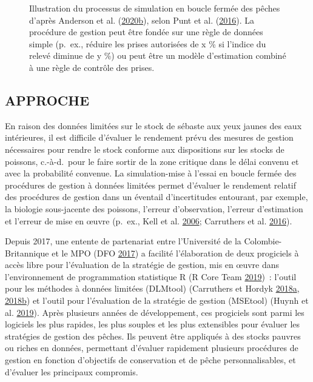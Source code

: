 \documentclass[french,11pt]{book}
\begin{document}
\begin{figure}[htb]

{\centering {} 

}

\caption{Illustration du processus de simulation en boucle fermée des pêches d'après Anderson et al. (\protect\hyperlink{ref-anderson2020gfmp}{2020}\protect\hyperlink{ref-anderson2020gfmp}{b}), selon Punt et al. (\protect\hyperlink{ref-punt2016}{2016}). La procédure de gestion peut être fondée sur une règle de données simple (p.~ex., réduire les prises autorisées de x \% si l'indice du relevé diminue de y \%) ou peut être un modèle d'estimation combiné à une règle de contrôle des prises.}\label{fig:mse-chart-basic}
\end{figure}
\hypertarget{sec:introduction-approach}{%
\subsection{APPROCHE}\label{sec:introduction-approach}}

En raison des données limitées sur le stock de sébaste aux yeux jaunes des eaux intérieures, il est difficile d'évaluer le rendement prévu des mesures de gestion nécessaires pour rendre le stock conforme aux dispositions sur les stocks de poissons, c.-à-d.~pour le faire sortir de la zone critique dans le délai convenu et avec la probabilité convenue. La simulation-mise à l'essai en boucle fermée des procédures de gestion à données limitées permet d'évaluer le rendement relatif des procédures de gestion dans un éventail d'incertitudes entourant, par exemple, la biologie sous-jacente des poissons, l'erreur d'observation, l'erreur d'estimation et l'erreur de mise en œuvre (p.~ex., Kell et al. \protect\hyperlink{ref-kell2006}{2006}; Carruthers et al. \protect\hyperlink{ref-carruthers2016}{2016}).

Depuis 2017, une entente de partenariat entre l'Université de la Colombie-Britannique et le MPO (DFO \protect\hyperlink{ref-dfo_dlmtool_2017}{2017}) a facilité l'élaboration de deux progiciels à accès libre pour l'évaluation de la stratégie de gestion, mis en œuvre dans l'environnement de programmation statistique R (R Core Team \protect\hyperlink{ref-r2019}{2019})~: l'outil pour les méthodes à données limitées (DLMtool) (Carruthers et Hordyk \protect\hyperlink{ref-carruthers2018}{2018}\protect\hyperlink{ref-carruthers2018}{a}, \protect\hyperlink{ref-carruthers_hordyk_2018}{2018}\protect\hyperlink{ref-carruthers_hordyk_2018}{b}) et l'outil pour l'évaluation de la stratégie de gestion (MSEtool) (Huynh et al. \protect\hyperlink{ref-huynh_msetool_2019}{2019}). Après plusieurs années de développement, ces progiciels sont parmi les logiciels les plus rapides, les plus souples et les plus extensibles pour évaluer les stratégies de gestion des pêches. Ils peuvent être appliqués à des stocks pauvres ou riches en données, permettant d'évaluer rapidement plusieurs procédures de gestion en fonction d'objectifs de conservation et de pêche personnalisables, et d'évaluer les principaux compromis.
\end{document}
